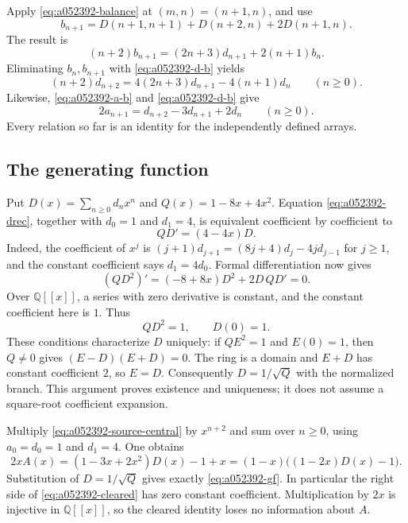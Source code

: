 Apply \eqref{eq:a052392-balance} at $(m,n)=(n+1,n)$, and use
\[
 b_{n+1}=D(n+1,n+1)+D(n+2,n)+2D(n+1,n).
\]
The result is
\begin{equation}\label{eq:a052392-brec}
 (n+2)b_{n+1}=(2n+3)d_{n+1}+2(n+1)b_n.
\end{equation}
Eliminating $b_n,b_{n+1}$ with \eqref{eq:a052392-d-b} yields
\begin{equation}\label{eq:a052392-drec}
 (n+2)d_{n+2}=4(2n+3)d_{n+1}-4(n+1)d_n\qquad(n\ge0).
\end{equation}
Likewise, \eqref{eq:a052392-a-b} and \eqref{eq:a052392-d-b} give
\begin{equation}\label{eq:a052392-source-central}
 2a_{n+1}=d_{n+2}-3d_{n+1}+2d_n\qquad(n\ge0).
\end{equation}
Every relation so far is an identity for the independently defined arrays.

\subsection{The generating function}

Put $D(x)=\sum_{n\ge0}d_nx^n$ and $Q(x)=1-8x+4x^2$.
Equation \eqref{eq:a052392-drec}, together with $d_0=1$ and $d_1=4$,
is equivalent coefficient by coefficient to
\begin{equation}\label{eq:a052392-ode}
 QD'=(4-4x)D.
\end{equation}
Indeed, the coefficient of $x^j$ is
$(j+1)d_{j+1}=(8j+4)d_j-4jd_{j-1}$ for $j\ge1$,
and the constant coefficient says $d_1=4d_0$.
Formal differentiation now gives
\[
 (QD^2)'=(-8+8x)D^2+2D\,QD'=0.
\]
Over $\mathbb Q[[x]]$, a series with zero derivative is constant, and the
constant coefficient here is $1$. Thus
\begin{equation}\label{eq:a052392-square}
 QD^2=1,\qquad D(0)=1.
\end{equation}
These conditions characterize $D$ uniquely: if $QE^2=1$ and $E(0)=1$,
then $Q\ne0$ gives $(E-D)(E+D)=0$. The ring is a domain and $E+D$ has
constant coefficient $2$, so $E=D$. Consequently $D=1/\sqrt Q$ with
the normalized branch. This argument proves existence and uniqueness;
it does not assume a square-root coefficient expansion.

Multiply \eqref{eq:a052392-source-central} by $x^{n+2}$ and sum over
$n\ge0$, using $a_0=d_0=1$ and $d_1=4$. One obtains
\begin{equation}\label{eq:a052392-cleared}
 2xA(x)=(1-3x+2x^2)D(x)-1+x
       =(1-x)\bigl((1-2x)D(x)-1\bigr).
\end{equation}
Substitution of $D=1/\sqrt Q$ gives exactly
\eqref{eq:a052392-gf}. In particular the right side of
\eqref{eq:a052392-cleared} has zero constant coefficient. Multiplication
by $2x$ is injective in $\mathbb Q[[x]]$, so the cleared identity loses
no information about $A$.

